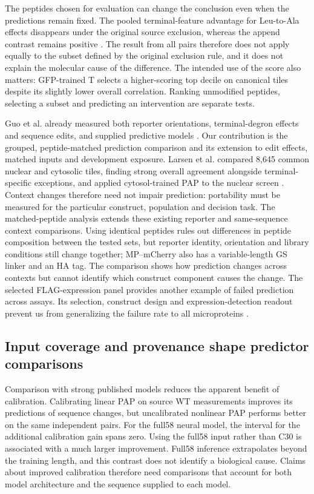 \documentclass[11pt,a4paper]{article}
\begin{document}
The peptides chosen for evaluation can change the conclusion even when the predictions remain fixed. The pooled terminal-feature advantage for Leu-to-Ala effects
disappears under the original source exclusion, whereas the append contrast
remains positive \cite{guo}. The result from all pairs therefore does not apply equally to the subset defined by the original exclusion rule, and it does not explain the molecular cause of the difference. The intended use of the score also matters: GFP-trained T selects a higher-scoring top decile on canonical
tiles despite its slightly lower overall correlation. Ranking unmodified
peptides, selecting a subset and predicting an intervention are separate tests.

Guo et al. already measured both reporter orientations, terminal-degron
effects and sequence edits, and supplied predictive models \cite{guo}.
Our contribution is the grouped, peptide-matched prediction comparison and
its extension to edit effects, matched inputs and development exposure.
Larsen et al. compared 8,645 common nuclear and cytosolic tiles, finding
strong overall agreement alongside terminal-specific exceptions, and
applied cytosol-trained PAP to the nuclear screen \cite{larsen}.
Context changes therefore need not impair prediction: portability must be
measured for the particular construct, population and decision task.
The matched-peptide analysis extends these existing reporter and
same-sequence context comparisons. Using identical peptides rules out differences in peptide composition between the tested sets, but reporter identity, orientation and library conditions still change together; MP--mCherry also has a variable-length GS
linker and an HA tag. The comparison shows how prediction changes across contexts but cannot identify which construct component causes the change. The selected FLAG-expression panel provides another example of failed prediction across assays. Its selection, construct design and expression-detection readout prevent us from generalizing the failure rate to all microproteins \cite{yang}.

\subsection{Input coverage and provenance shape predictor comparisons}
Comparison with strong published models reduces the apparent benefit of calibration.
Calibrating linear PAP on source WT measurements improves its predictions of sequence changes, but uncalibrated nonlinear PAP performs better on the same independent pairs. For the full58 neural model, the interval for the additional calibration gain spans zero. Using the full58 input rather than C30 is associated with a much larger improvement. Full58 inference extrapolates
beyond the training length, and this contrast does not identify a biological
cause. Claims about improved calibration therefore need comparisons that account for both model architecture and the sequence supplied to each model.
\end{document}
